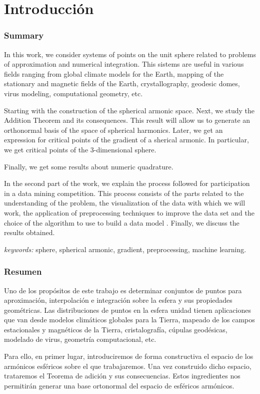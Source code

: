 \chapter*{Introducción}
\subsection*{Summary}

In this work, we consider systems of points on the unit sphere related to problems of approximation and numerical integration. This sistems are useful in various fields ranging from global climate models for the Earth, mapping of the stationary and magnetic fields of the Earth, crystallography, geodesic domes, virus modeling, computational geometry, etc.
\medskip

Starting with the construction of the spherical armonic space. Next, we study the Addition Theorem and its consequences. This result will allow us to generate an	 orthonormal basis of the space of spherical harmonics. 
Later, we get an expression for critical points of the gradient of a sherical armonic. In particular, we get critical points of the 3-dimensional sphere. 

Finally, we get some results about numeric quadrature.

\medskip
In the second part of the work, we explain the process followed for participation in a data mining competition. This process consists of the parts related to the understanding of the problem, the visualization of the data with which we will work, the application of preprocessing techniques to improve the data set and the choice of the algorithm to use to build a data model . Finally, we discuss the results obtained.

\bigskip
\emph{keywords:} sphere, spherical armonic, gradient, preprocessing, machine learning.
\newpage
\subsection*{Resumen}
Uno de los propósitos de este trabajo es determinar conjuntos de puntos para aproximación, interpolación e integración sobre la esfera y sus propiedades geométricas. Las distribuciones de puntos en la esfera unidad tienen aplicaciones que van desde modelos climáticos globales para la  Tierra, mapeado de los campos estacionales y magnéticos de la Tierra, cristalografía, cúpulas geodésicas, modelado de virus, geometría computacional, etc.

\medskip
Para ello, en primer lugar, introduciremos de forma constructiva el espacio de los armónicos esféricos sobre el que trabajaremos. Una vez construido dicho espacio, trataremos el Teorema de adición y sus consecuencias. Estos ingredientes nos permitirán generar una base ortonormal del espacio de esféricos armónicos.

